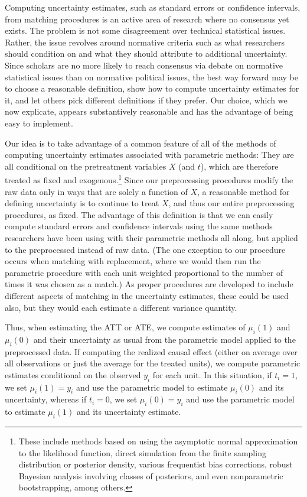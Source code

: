\documentclass[11pt,titlepage]{article}
\begin{document}
Computing uncertainty estimates, such as standard errors or confidence
intervals, from matching procedures is an active area of research
where no consensus yet exists.  The problem is not some disagreement
over technical statistical issues.  Rather, the issue revolves around
normative criteria such as what researchers should condition on and
what they should attribute to additional uncertainty.  Since scholars
are no more likely to reach consensus via debate on normative
statistical issues than on normative political issues, the best way
forward may be to choose a reasonable definition, show how to compute
uncertainty estimates for it, and let others pick different
definitions if they prefer.  Our choice, which we now explicate,
appears substantively reasonable and has the advantage of being easy
to implement.

Our idea is to take advantage of a common feature of all of the
methods of computing uncertainty estimates associated with parametric
methods: They are all conditional on the pretreatment variables $X$
(and $t$), which are therefore treated as fixed and
exogenous.\footnote{These include methods based on using the
  asymptotic normal approximation to the likelihood function, direct
  simulation from the finite sampling distribution or posterior
  density, various frequentist bias corrections, robust Bayesian
  analysis involving classes of posteriors, and even nonparametric
  bootstrapping, among others.}  Since our preprocessing procedures
modify the raw data only in ways that are solely a function of $X$, a
reasonable method for defining uncertainty is to continue to treat
$X$, and thus our entire preprocessing procedures, as fixed.  The
advantage of this definition is that we can easily compute standard
errors and confidence intervals using the same methods researchers
have been using with their parametric methods all along, but applied
to the preprocessed instead of raw data.  (The one exception to our
procedure occurs when matching with replacement, where we would then
run the parametric procedure with each unit weighted proportional to
the number of times it was chosen as a match.)  As proper procedures
are developed to include different aspects of matching in the
uncertainty estimates, these could be used also, but they would each
estimate a different variance quantity.

Thus, when estimating the ATT or ATE, we compute estimates of
$\mu_i(1)$ and $\mu_i(0)$ and their uncertainty as usual from the
parametric model applied to the preprocessed data.  If computing the
realized causal effect (either on average over all observations or
just the average for the treated units), we compute parametric
estimates conditional on the observed $y_i$ for each unit.  In this
situation, if $t_i=1$, we set $\mu_i(1)=y_i$ and use the parametric
model to estimate $\mu_i(0)$ and its uncertainty, whereas if $t_i=0$,
we set $\mu_i(0)=y_i$ and use the parametric model to estimate
$\mu_i(1)$ and its uncertainty estimate.
\end{document}

